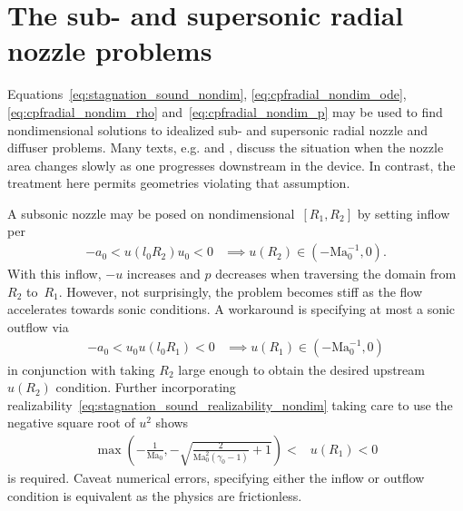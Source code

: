 \documentclass[letterpaper,11pt,nointlimits,reqno]{amsart}
\newcommand{\Mach}[1][]{\mbox{Ma}_{#1}}
\begin{document}
\section{The sub- and supersonic radial nozzle problems}

Equations~\eqref{eq:stagnation_sound_nondim}, \eqref{eq:cpfradial_nondim_ode},
\eqref{eq:cpfradial_nondim_rho} and~\eqref{eq:cpfradial_nondim_p} may be used
to find nondimensional solutions to idealized sub- and supersonic radial nozzle
and diffuser problems. Many texts, e.g.
\citet[\textsection{}9.4]{White1999Fluid} and
\citet[\textsection{}97]{Landau2004Fluid}, discuss the situation when the
nozzle area changes slowly as one progresses downstream in the device.  In
contrast, the treatment here permits geometries violating that assumption.

A subsonic nozzle may be posed on nondimensional~$\left[R_{1}, R_{2}\right]$ by
setting inflow per
\begin{align}
    -a_0 < u\!\left(l_0 R_{2}\right) u_0 < 0
    &\implies
    u\!\left(R_{2}\right) \in \left(-\Mach[0]^{-1}, 0\right)
.
\end{align}
With this inflow, $-u$ increases and $p$ decreases when traversing the
domain from~$R_{2}$ to~$R_{1}$.  However, not surprisingly, the problem becomes
stiff as the flow accelerates towards sonic conditions.  A workaround is
specifying at most a sonic outflow via
\begin{align}
    -a_0 < u_0 u\!\left(l_0 R_1\right) < 0
    &\implies
    u\!\left(R_1\right) \in \left(-\Mach[0]^{-1}, 0\right)
\end{align}
in conjunction with taking $R_{2}$ large enough to obtain the desired upstream
$u\!\left(R_{2}\right)$ condition.  Further incorporating
realizability~\eqref{eq:stagnation_sound_realizability_nondim} taking care to
use the negative square root of $u^2$ shows
\begin{align}
  \max\left(
    -\frac{1}{\Mach[0]}, -\sqrt{\frac{2}{\Mach[0]^2\left(\gamma_0-1\right)}+1}
  \right) < &u\!\left(R_1\right) < 0
\label{eq:cpfradial_nozzle_subsonic_bc}
\end{align}
is required.  Caveat numerical errors, specifying either the inflow or outflow
condition is equivalent as the physics are frictionless.
\end{document}
